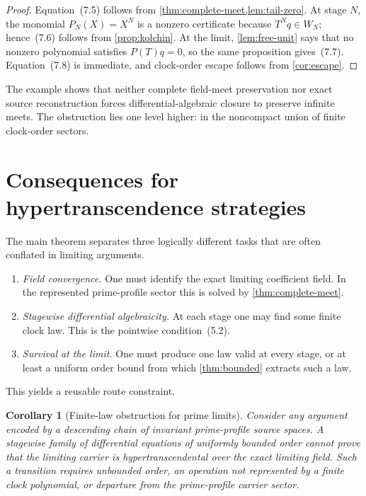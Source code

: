 \documentclass[11pt]{article}
\newtheorem{corollary}[theorem]{Corollary}
\theoremstyle{definition}
\theoremstyle{remark}
\begin{document}
\begin{proof}
Equation~(7.5) follows from \cref{thm:complete-meet,lem:tail-zero}.  At stage $N$, the monomial
$P_N(X)=X^N$ is a nonzero certificate because $T^Nq\in W_N$; hence~(7.6) follows from
\cref{prop:kolchin}.  At the limit, \cref{lem:free-unit} says that no nonzero polynomial satisfies
$P(T)q=0$, so the same proposition gives~(7.7).  Equation~(7.8) is immediate, and clock-order
escape follows from \cref{cor:escape}.
\end{proof}

The example shows that neither complete field-meet preservation nor exact source reconstruction
forces differential-algebraic closure to preserve infinite meets.  The obstruction lies one level
higher: in the noncompact union of finite clock-order sectors.

\section{Consequences for hypertranscendence strategies}\label{sec:consequences}

The main theorem separates three logically different tasks that are often conflated in limiting
arguments.

\begin{enumerate}
\item \emph{Field convergence.}  One must identify the exact limiting coefficient field.  In the
represented prime-profile sector this is solved by \cref{thm:complete-meet}.

\item \emph{Stagewise differential algebraicity.}  At each stage one may find some finite clock
law.  This is the pointwise condition~(5.2).

\item \emph{Survival at the limit.}  One must produce one law valid at every stage, or at least a
uniform order bound from which \cref{thm:bounded} extracts such a law.
\end{enumerate}

This yields a reusable route constraint.

\begin{corollary}[Finite-law obstruction for prime limits]\label{cor:route}
Consider any argument encoded by a descending chain of invariant prime-profile source spaces.  A
stagewise family of differential equations of uniformly bounded order cannot prove that the
limiting carrier is hypertranscendental over the exact limiting field.  Such a transition requires
unbounded order, an operation not represented by a finite clock polynomial, or departure from the
prime-profile carrier sector.
\end{corollary}
\end{document}
